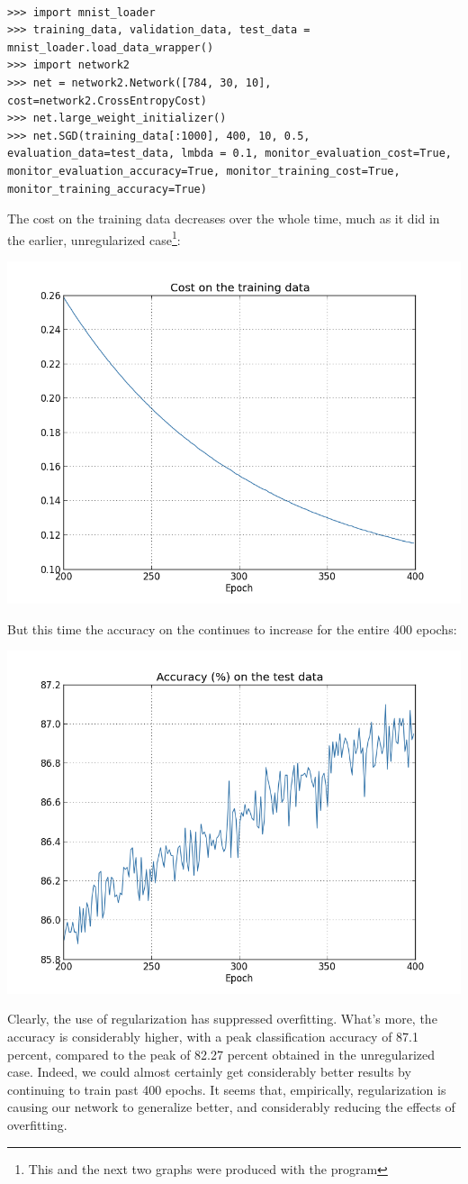 \documentclass[a4paper,twoside,10pt]{book}
\begin{document}
\begin{lstlisting}

>>> import mnist_loader 
>>> training_data, validation_data, test_data =  mnist_loader.load_data_wrapper() 
>>> import network2 
>>> net = network2.Network([784, 30, 10], cost=network2.CrossEntropyCost)
>>> net.large_weight_initializer()
>>> net.SGD(training_data[:1000], 400, 10, 0.5, evaluation_data=test_data, lmbda = 0.1, monitor_evaluation_cost=True, monitor_evaluation_accuracy=True, monitor_training_cost=True, monitor_training_accuracy=True)
\end{lstlisting}
The cost on the training data decreases over the whole time, much as it did in the earlier, unregularized case\footnote{This and the next two graphs were produced with the program }:
\begin{center}
	\includegraphics[width=0.6\linewidth]{figures/ch3/regularized1}
\end{center}
But this time the accuracy on the  continues to increase for the entire 400 epochs:
\begin{center}
	\includegraphics[width=0.6\linewidth]{figures/ch3/regularized2}
\end{center}
Clearly, the use of regularization has suppressed overfitting. What's more, the accuracy is considerably higher, with a peak classification accuracy of 87.1 percent, compared to the peak of 82.27 percent obtained in the unregularized case. Indeed, we could almost certainly get considerably better results by continuing to train past 400 epochs. It seems that, empirically, regularization is causing our network to generalize better, and considerably reducing the effects of overfitting.
\end{document}
